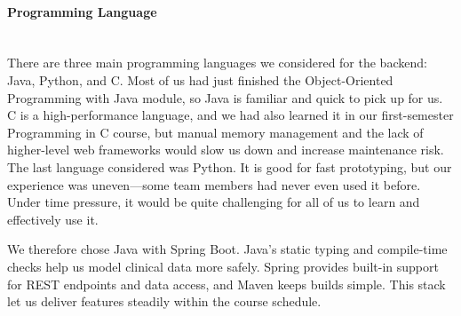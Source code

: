 \paragraph{Programming Language}\mbox{}\\
There are three main programming languages we considered for the backend: Java, Python, and C. Most of us had just finished the Object-Oriented Programming with Java module, so Java is familiar and quick to pick up for us. C is a high-performance language, and we had also learned it in our first-semester Programming in C course, but manual memory management and the lack of higher-level web frameworks would slow us down and increase maintenance risk. The last language considered was Python. It is good for fast prototyping, but our experience was uneven—some team members had never even used it before. Under time pressure, it would be quite challenging for all of us to learn and effectively use it.

We therefore chose Java with Spring Boot. Java's static typing and compile-time checks help us model clinical data more safely. Spring provides built-in support for REST endpoints and data access, and Maven keeps builds simple. This stack let us deliver features steadily within the course schedule.
